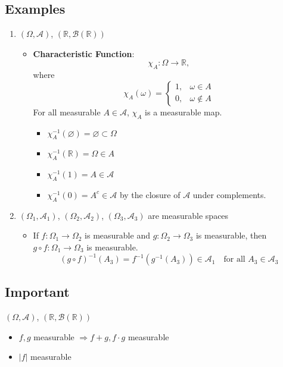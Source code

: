 \documentclass[11pt]{book}
\numberwithin{equation}{chapter}
\theoremstyle{boldStyle}
\begin{document}
\subsection{Examples}

\begin{enumerate}
    \item \((\Omega, \mathcal{A})\), \((\mathbb{R}, \mathcal{B}(\mathbb{R}))\)
    \begin{itemize}
        \item \textbf{Characteristic Function}:
        \[
        \chi_A: \Omega \to \mathbb{R},
        \]
        where
        \[
        \chi_A(\omega) =
        \begin{cases}
        1, & \omega \in A \\
        0, & \omega \notin A
        \end{cases}
        \]
        For all measurable \(A \in \mathcal{A}\), \(\chi_A\) is a measurable map.
        \begin{itemize}
            \item \(\chi_A^{-1}(\varnothing) = \varnothing \subset \Omega\)
            \item \(\chi_A^{-1}(\mathbb{R}) = \Omega \in A\)
            \item \(\chi_A^{-1}({1}) = A \in \mathcal{A}\)
            \item \(\chi_A^{-1}({0}) = A^c \in \mathcal{A}\) by the closure of \(\mathcal{A}\) under complements.
        \end{itemize}
    \end{itemize}

    \item \((\Omega_1, \mathcal{A}_1)\), \((\Omega_2, \mathcal{A}_2)\), \((\Omega_3, \mathcal{A}_3)\) are measurable spaces
    \begin{itemize}
        \item If \(f: \Omega_1 \to \Omega_2\) is measurable and \(g: \Omega_2 \to \Omega_3\) is measurable, then \(g \circ f: \Omega_1 \to \Omega_3\) is measurable.
        \[
        (g \circ f)^{-1}(A_3) = f^{-1}(g^{-1}(A_3)) \in \mathcal{A}_1 \quad \text{for all } A_3 \in \mathcal{A}_3
        \]
    \end{itemize}
\end{enumerate}

\subsection*{Important}

\((\Omega, \mathcal{A})\), \((\mathbb{R}, \mathcal{B}(\mathbb{R}))\)
\begin{itemize}
    \item \(f, g\) measurable \(\Rightarrow f + g, f \cdot g\) measurable
    \item \(|f|\) measurable
\end{itemize}
\end{document}

